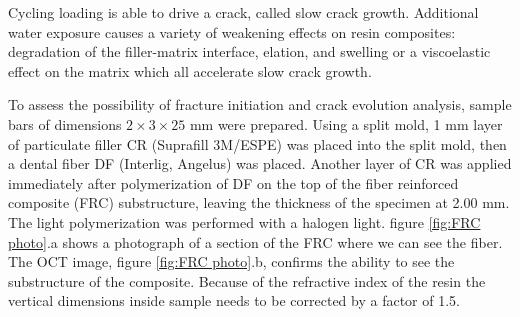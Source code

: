 \documentclass[12pt,twoside,english]{book}
\renewcommand{\~}{\perispomeni}%
\numberwithin{equation}{section}
\numberwithin{figure}{section}
\begin{document}
Cycling loading is able to drive a crack, called slow crack growth. Additional water exposure causes a variety of weakening effects on resin composites: degradation of the filler-matrix interface, elation, and swelling or a viscoelastic effect on the matrix which all accelerate slow crack growth\cite{Soderholm:1990p2521}. 

To assess the possibility of fracture initiation and crack evolution analysis, sample bars of dimensions $2\times3\times25$ mm were prepared. Using a split mold, 1 mm layer of particulate filler CR (Suprafill 3M/ESPE) was placed into the split mold, then a dental fiber DF (Interlig, Angelus) was placed. Another layer of CR was applied immediately after polymerization of DF on the top of the fiber reinforced composite (FRC) substructure, leaving the thickness of the specimen at 2.00 mm. The light polymerization was performed with a halogen light. figure \ref{fig:FRC photo}.a shows a photograph of a section of the FRC where we can see the fiber. The OCT image, figure \ref{fig:FRC photo}.b, confirms the ability to see the substructure of the composite. Because of the refractive index of the resin the vertical dimensions inside sample needs to be corrected by a factor of 1.5. 
\end{document}
